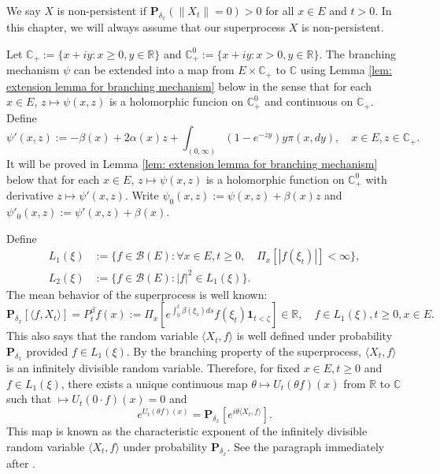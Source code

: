     We say $X$ is non-persistent if $\mathbf P_{\delta_x}(\|X_t\| = 0)>0$ for all $x\in E$ and $t >0$. 
    In this chapter, we will always assume that our superprocess $X$ is non-persistent.

    Let $\mathbb C_+:=\{x+iy:x\geq 0, y\in \mathbb R\}$ and $\mathbb C_+^0:=\{x+iy: x>0, y\in \mathbb R\}$.
    The branching mechanism $\psi$ can be extended into a map from $E \times \mathbb C_+$ to $\mathbb C$ using Lemma \ref{lem: extension lemma for branching mechanism} below in the sense that for each $x\in E$, $z\mapsto \psi(x,z)$ is a holomorphic funcion on $\mathbb C_+^0$ and continuous on $\mathbb C_+$.
    Define
\begin{equation}
    \psi'(x,z):= - \beta(x) + 2\alpha(x) z + \int_{(0,\infty)} (1-e^{-zy})y\pi(x,dy),
    \quad x\in E, z\in \mathbb C_+.
\end{equation}
    It will be proved in Lemma \ref{lem: extension lemma for branching mechanism} below that for each $x \in E$, $z \mapsto \psi(x,z)$ is a holomorphic function on $\mathbb C_+^0$ with derivative $z \mapsto \psi'(x,z)$.
    Write $\psi_0(x,z) := \psi(x,z)+ \beta(x)z $ and $\psi'_0(x,z) := \psi'(x,z) + \beta(x)$.

    Define
\begin{align}
    L_1(\xi)
    &:= \{f\in \mathcal B(E): \forall x\in E, t\geq 0, \quad \Pi_x[|f(\xi_t)|]< \infty\},
    \\L_2(\xi)
    &:= \{f \in \mathcal B(E): |f|^2 \in L_1(\xi)\}.
\end{align}
    The mean behavior of the superprocess is well known:
\begin{equation}   
    \mathbf P_{\delta_x}[\langle f, X_t\rangle]
    =P^{\beta}_t f(x):= \Pi_x[e^{\int_0^t \beta(\xi_s)ds}f(\xi_t)\mathbf 1_{t < \zeta}] \in \mathbb R,
    \quad f\in L_1(\xi), t \geq 0,x\in E.
\end{equation}
    This also says that the random variable $\langle X_t, f\rangle$ is well defined under probability $\mathbf P_{\delta_x}$ provided $f\in L_1(\xi)$.
    By the branching property of the superprocess, $\langle X_t, f\rangle$ is an infinitely divisible random variable.
    Therefore, for fixed $x\in E, t\geq 0$ and $f\in L_1(\xi)$, there exists a unique continuous map $\theta \mapsto U_t(\theta f)(x)$ from $\mathbb R$ to $\mathbb C$ such that $\mapsto U_t(0\cdot f)(x) = 0$ and
\[
    e^{U_t(\theta f)(x)} = \mathbf P_{\delta_x}[e^{i\theta \langle X_t,f\rangle}].
\]
    This map is known as the characteristic exponent of the infinitely divisible random variable $\langle X_t,f\rangle$ under probability $\mathbf P_{\delta_x}$. 
    See the paragraph immediately after \cite[Lemma 7.6]{Sato2013Levy}.

